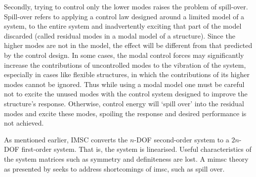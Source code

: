 \begin{multicols}{2}
Secondly, trying to control only the lower modes raises the problem of spill-over.
Spill-over refers to applying a control law designed around a limited
model of a system, to the entire system and inadvertently exciting that part of the
model discarded (called residual modes in a modal model of a structure). Since the 
higher modes are not in the model, the effect will be different from that predicted
by the control design. In some cases, the modal control forces may significantly 
increase the contributions of uncontrolled modes to the vibration of the system, 
especially in cases like flexible structures, in which the contributions of its 
higher modes cannot be ignored. Thus while using a modal model one must be careful
not to excite the unused modes with the control system designed to improve the 
structure's response. Otherwise, control energy will `spill over' into the residual 
modes and excite these modes, spoiling the response and desired performance is not 
achieved. 

As mentioned earlier, IMSC converts the $n$-DOF second-order system to a $2n$-DOF
first-order system. That is, the system is linearised. Useful characteristics of 
the system matrices such as symmetry and definiteness are lost. A \gls{mimsc} 
theory as presented by \citet{Fang2003421} seeks to address shortcomings of 
\gls{imsc}, such as spill over.
\end{multicols}
